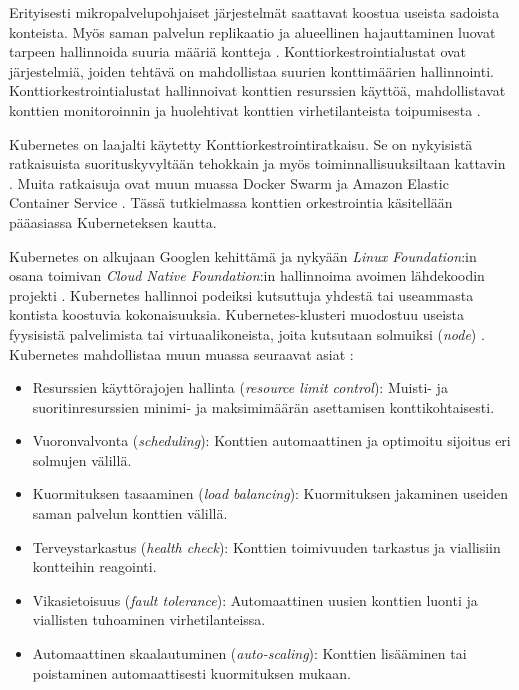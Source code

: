 Erityisesti mikropalvelupohjaiset järjestelmät saattavat koostua useista sadoista konteista.
Myös saman palvelun replikaatio ja alueellinen hajauttaminen luovat tarpeen hallinnoida suuria määriä kontteja \cite{Khan17}.
Konttiorkestrointialustat ovat järjestelmiä, joiden tehtävä on mahdollistaa suurien konttimäärien hallinnointi.
Konttiorkestrointialustat hallinnoivat konttien resurssien käyttöä, mahdollistavat konttien monitoroinnin ja huolehtivat konttien virhetilanteista toipumisesta \cite{Zhou21}.

Kubernetes on laajalti käytetty Konttiorkestrointiratkaisu.
Se on nykyisistä ratkaisuista suorituskyvyltään tehokkain ja myös toiminnallisuuksiltaan kattavin \cite{Jawarneh19}.
Muita ratkaisuja ovat muun muassa Docker Swarm ja Amazon Elastic Container Service \cite{Khan17}.
Tässä tutkielmassa konttien orkestrointia käsitellään pääasiassa Kuberneteksen kautta.

Kubernetes on alkujaan Googlen kehittämä ja nykyään \textit{Linux Foundation}:in osana toimivan \textit{Cloud Native Foundation}:in hallinnoima avoimen lähdekoodin projekti \cite{Burns22}.
Kubernetes hallinnoi podeiksi kutsuttuja yhdestä tai useammasta kontista koostuvia kokonaisuuksia.
Kubernetes-klusteri muodostuu useista fyysisistä palvelimista tai virtuaalikoneista, joita kutsutaan solmuiksi (\textit{node}) \cite{Medel18}.
Kubernetes mahdollistaa muun muassa seuraavat asiat \cite{Zhou21}:

\begin{itemize}
\item Resurssien käyttörajojen hallinta (\textit{resource limit control}): Muisti- ja suoritinresurssien minimi- ja maksimimäärän asettamisen konttikohtaisesti.
\item Vuoronvalvonta (\textit{scheduling}): Konttien automaattinen ja optimoitu sijoitus eri solmujen välillä.
\item Kuormituksen tasaaminen (\textit{load balancing}): Kuormituksen jakaminen useiden saman palvelun konttien välillä. 
\item Terveystarkastus (\textit{health check}): Konttien toimivuuden tarkastus ja viallisiin kontteihin reagointi.
\item Vikasietoisuus (\textit{fault tolerance}): Automaattinen uusien konttien luonti ja viallisten tuhoaminen virhetilanteissa.
\item Automaattinen skaalautuminen (\textit{auto-scaling}): Konttien lisääminen tai poistaminen automaattisesti kuormituksen mukaan.
\end{itemize}

